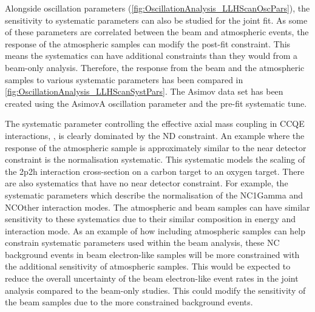 \clearpage

Alongside oscillation parameters (\autoref{fig:OscillationAnalysis_LLHScanOscPars}), the sensitivity to systematic parameters can also be studied for the joint fit. As some of these parameters are correlated between the beam and atmospheric events, the response of the atmospheric samples can modify the post-fit constraint. This means the systematics can have additional constraints than they would from a beam-only analysis. Therefore, the response from the beam and the atmospheric samples to various systematic parameters has been compared in \autoref{fig:OscillationAnalysis_LLHScanSystPars}. The Asimov data set has been created using the AsimovA oscillation parameter and the pre-fit systematic tune.

The systematic parameter controlling the effective axial mass coupling in CCQE interactions, , is clearly dominated by the ND constraint. An example where the response of the atmospheric sample is approximately similar to the near detector constraint is the  normalisation systematic. This systematic models the scaling of the 2p2h interaction cross-section on a carbon target to an oxygen target. There are also systematics that have no near detector constraint. For example, the systematic parameters which describe the normalisation of the NC1Gamma and NCOther interaction modes. The atmospheric and beam samples can have similar sensitivity to these systematics due to their similar composition in energy and interaction mode. As an example of how including atmospheric samples can help constrain systematic parameters used within the beam analysis, these NC background events in beam electron-like samples will be more constrained with the additional sensitivity of atmospheric samples. This would be expected to reduce the overall uncertainty of the beam electron-like event rates in the joint analysis compared to the beam-only studies. This could modify the sensitivity of the beam samples due to the more constrained background events.

